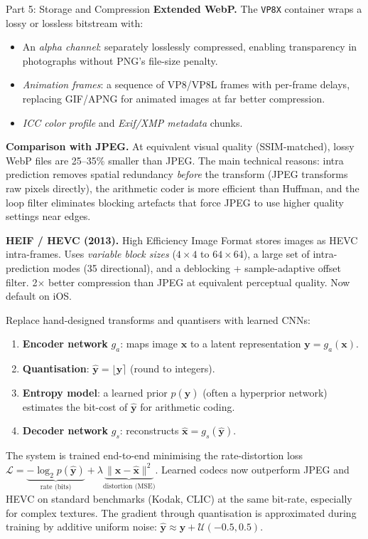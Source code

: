 \documentclass[letterpaper]{article}
\begin{document}
\begin{notes}{Part 5: Storage and Compression}
\textbf{Extended WebP.} The \texttt{VP8X} container wraps a lossy or lossless bitstream with:
\begin{itemize}
    \item An \emph{alpha channel}: separately losslessly compressed, enabling transparency in photographs without PNG's file-size penalty.
    \item \emph{Animation frames}: a sequence of VP8/VP8L frames with per-frame delays, replacing GIF/APNG for animated images at far better compression.
    \item \emph{ICC color profile} and \emph{Exif/XMP metadata} chunks.
\end{itemize}

\textbf{Comparison with JPEG.} At equivalent visual quality (SSIM-matched), lossy WebP files are 25--35\% smaller than JPEG. The main technical reasons: intra prediction removes spatial redundancy \emph{before} the transform (JPEG transforms raw pixels directly), the arithmetic coder is more efficient than Huffman, and the loop filter eliminates blocking artefacts that force JPEG to use higher quality settings near edges.



\textbf{HEIF / HEVC (2013).} High Efficiency Image Format stores images as HEVC intra-frames. Uses \emph{variable block sizes} ($4\times4$ to $64\times64$), a large set of intra-prediction modes (35 directional), and a deblocking + sample-adaptive offset filter. 2$\times$ better compression than JPEG at equivalent perceptual quality. Now default on iOS.


Replace hand-designed transforms and quantisers with learned CNNs:
\begin{enumerate}
    \item \textbf{Encoder network} $g_a$: maps image $\mathbf{x}$ to a latent representation $\mathbf{y} = g_a(\mathbf{x})$.
    \item \textbf{Quantisation}: $\hat{\mathbf{y}} = \lfloor \mathbf{y} \rceil$ (round to integers).
    \item \textbf{Entropy model}: a learned prior $p(\hat{\mathbf{y}})$ (often a hyperprior network) estimates the bit-cost of $\hat{\mathbf{y}}$ for arithmetic coding.
    \item \textbf{Decoder network} $g_s$: reconstructs $\hat{\mathbf{x}} = g_s(\hat{\mathbf{y}})$.
\end{enumerate}
The system is trained end-to-end minimising the rate-distortion loss $\mathcal{L} = \underbrace{-\log_2 p(\hat{\mathbf{y}})}_{\text{rate (bits)}} + \lambda\underbrace{\|\mathbf{x} - \hat{\mathbf{x}}\|^2}_{\text{distortion (MSE)}}$.
Learned codecs now outperform JPEG and HEVC on standard benchmarks (Kodak, CLIC) at the same bit-rate, especially for complex textures. The gradient through quantisation is approximated during training by additive uniform noise: $\hat{\mathbf{y}} \approx \mathbf{y} + \mathcal{U}(-0.5, 0.5)$.


\end{notes}
\end{document}
